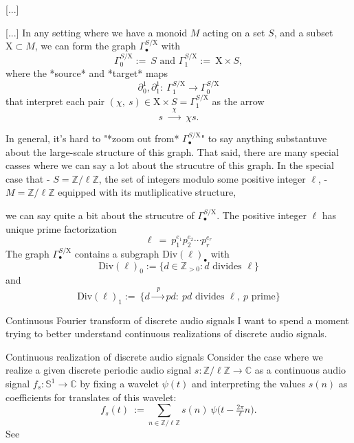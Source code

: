 \documentclass[11pt, a4paper]{article}
\newcommand{\Chi}{\mathrm{X}}
\begin{document}
\begin{section}{[...]}

\begin{subsection}{[...]}
In any setting where we have a monoid $M$ acting on a set $S$, and a subset $\Chi\subset M$, we can form the graph $\Gamma^{S/\Chi}_{\bullet}$ with
$$
\Gamma^{S/\Chi}_{0}:=\ S\text{\ \ \ \ \ \ and\ \ \ \ \ \ }\Gamma^{S/\Chi}_{1}:=\ \Chi\times S,
$$
where the *source* and *target* maps $$\partial^{1}_0,\partial^{1}_1:\ \Gamma^{S/\Chi}_1\!\!\longrightarrow\Gamma^{S/\Chi}_{0}$$ that interpret each pair $(\chi,\ s)\in \Chi\times S=\Gamma^{S/\Chi}_1$ as the arrow $$s\ \!\xrightarrow{\ \ \ \chi\ \ \ }\ \!\chi s.$$

In general, it's hard to "*zoom out from* $\Gamma^{S/\Chi}_{\bullet}$" to say anything substantuve about the large-scale structure of this graph. That said, there are many special casses where we can say a lot about the strucutre of this graph. In the special case that 
- $S=\mathbb{Z}/\ell\mathbb{Z}$, the set of integers modulo some positive integer $\ell$,
- $M=\mathbb{Z}/\ell\mathbb{Z}$ equipped with its mutliplicative structure,

we can say quite a bit about the strucutre of $\Gamma^{S/\Chi}_{\bullet}$. The positive integer $\ell$ has unique prime factorization $$\ell\ =\ p_{1}^{e_1}p_{2}^{e_2}\cdots p_{r}^{e_r}$$ The graph $\Gamma^{S/\Chi}_{\bullet}$ contains a subgraph $\text{Div}(\ell)_{\bullet}$ with $$\text{Div}(\ell)_{0}:=\{d\in\mathbb{Z}_{>0}:d\text{\ divides\ }\ell\}$$ and $$\text{Div}(\ell)_{1}:=\ \{d\xrightarrow{\ \ \ p\ \ }pd:\ pd\text{\ divides\ }\ell,\ p\text{\ prime}\}$$
\end{subsection}

\begin{subsection}{Continuous Fourier transform of discrete audio signals}
I want to spend a moment trying to better understand continuous realizations of discrete audio signals.

\begin{subsubsection}{Continuous realization of discrete audio signals}
Consider the case where we realize a given discrete periodic audio signal $s:\mathbb{Z}/\ell\mathbb{Z}\longrightarrow\mathbb{C}$ as a continuous audio signal $f_{\!s}:\mathbb{S}^1\!\longrightarrow\mathbb{C}$ by fixing a wavelet $\psi(t)$ and interpreting the values $s(n)$ as coefficients for translates of this wavelet:
$$
f_{\!s}(t)
\ :=\!\!
\sum_{n\in\mathbb{Z}/\ell\mathbb{Z}}
\!\!\!s(n)\ \psi\big(t\!-\!\tfrac{2\pi}{\ell}n\big).
$$
See \cite{Mallat}
\end{subsubsection}


\end{subsection}
\end{section}
\end{document}

